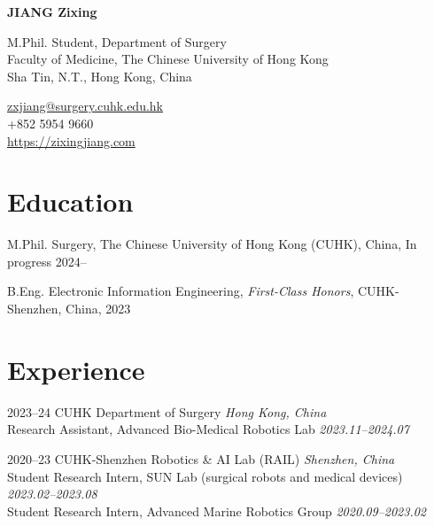 \documentclass[11pt,letterpaper]{report}
\newcommand{\myname}{JIANG Zixing}
\newcommand{\namefont}[1]{{\normalfont\bfseries\Huge{#1}}}
\begin{document}
	\thispagestyle{firstpagefooter}
	\raggedright{}
	
\namefont{\myname}
	
\vspace{1em}
\begin{minipage}[t]{0.700\textwidth}
	M.Phil. Student, Department of Surgery\\
	Faculty of Medicine, The Chinese University of Hong Kong\\
	Sha Tin, N.T., Hong Kong, China
\end{minipage}
\hfil
\begin{minipage}[t]{0.295\textwidth}
	\flushright{}
	\href{mailto:zxjiang@surgery.cuhk.edu.hk}{zxjiang@surgery.cuhk.edu.hk} \\
	+852 5954 9660 \\
	\href{https://zixingjiang.com}{https://zixingjiang.com}\\
\end{minipage}
	
\section*{Education}
\begin{tablist}
	\item[M.Phil.]  \tab{}Surgery, The Chinese University of Hong Kong (CUHK), China, In progress 2024--\\
	\item[B.Eng.]  \tab{}Electronic Information Engineering, \textit{First-Class Honors}, CUHK-Shenzhen, China, 2023\\
\end{tablist}
	

\section*{Experience}
	
\begin{tablist}
	\item[2023--24]   \tab{}CUHK Department of Surgery \hfill \textit{Hong Kong, China}\\
	Research Assistant, Advanced Bio-Medical Robotics Lab \hfill \textit{2023.11--2024.07}
		
	\item[2020--23]   \tab{}CUHK-Shenzhen Robotics \& AI Lab (RAIL) \hfill \textit{Shenzhen, China}\\
	Student Research Intern, SUN Lab (surgical robots and medical devices) \hfill \textit{2023.02--2023.08}\\
	Student Research Intern, Advanced Marine Robotics Group \hfill \textit{2020.09--2023.02}
\end{tablist}
	
\end{document}

